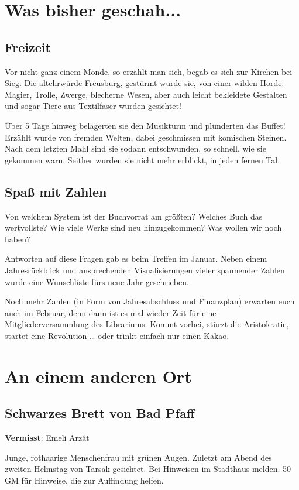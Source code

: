 \documentclass[final]{multiversum}
\begin{document}
\makemultititle
%

\section{Was bisher geschah...}

\subsection{Freizeit}
Vor nicht ganz einem Monde, so erzählt man sich, begab es sich zur Kirchen bei Sieg.
Die altehrwürde Freusburg, gestürmt wurde sie, von einer wilden Horde.
Magier, Trolle, Zwerge, blecherne Wesen, aber auch leicht bekleidete Gestalten und sogar Tiere aus Textilfaser wurden gesichtet!

Über 5 Tage hinweg belagerten sie den Musikturm und plünderten das Buffet!
Erzählt wurde von fremden Welten, dabei geschmissen mit komischen Steinen.
Nach dem letzten Mahl sind sie sodann entschwunden, so schnell, wie sie gekommen warn.
Seither wurden sie nicht mehr erblickt, in jeden fernen Tal.

\subsection{Spaß mit Zahlen}
Von welchem System ist der Buchvorrat am größten?
Welches Buch das wertvollste?
Wie viele Werke sind neu hinzugekommen?
Was wollen wir noch haben?

Antworten auf diese Fragen gab es beim Treffen im Januar.
Neben einem Jahresrückblick und ansprechenden Visualisierungen vieler spannender Zahlen wurde eine Wunschliste fürs neue Jahr geschrieben.

Noch mehr Zahlen (in Form von Jahresabschluss und Finanzplan) erwarten euch auch im Februar, denn dann ist es mal wieder Zeit für eine Mitgliederversammlung des Librariums.
Kommt vorbei, stürzt die Aristokratie, startet eine Revolution … oder trinkt einfach nur einen Kakao.


\section{An einem anderen Ort}
\setsubsubsecheadstyle{\centering\bfseries}

\subsection{Schwarzes Brett von Bad Pfaff}
\begin{center}
    \textbf{Vermisst}:
    Emeli Arzât
\end{center}
\vspace{-1.5em}
\noindent
Junge, rothaarige Menschenfrau mit grünen Augen.
Zuletzt am Abend des zweiten Helmstag von Tarsak gesichtet.
Bei Hinweisen im Stadthaus melden.
50 GM für Hinweise, die zur Auffindung helfen.
\end{document}
